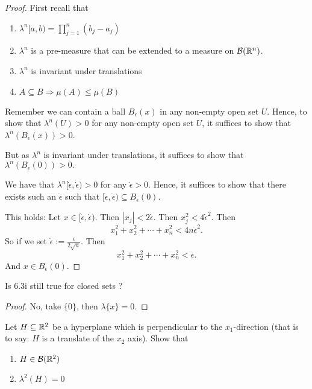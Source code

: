 \begin{proof}
First recall that

\begin{enumerate}
  \item \(\displaystyle \lambda ^n[a,b)=\prod _{j=1}^n(b_{j}-a_{j})\)
  \item \(\lambda ^n\) is a pre-measure that can be extended to a measure on \(\mathcal{B}(\Bbb{R}^n)\).
  \item \(\lambda ^n\) is invariant under translations
  \item \(A\subseteq B \Longrightarrow  \mu (A)\leq \mu (B)\)
\end{enumerate}

Remember we can contain a ball \(B_\epsilon(x)\) in any non-empty open set \(U\). Hence, to show that \(\lambda ^n(U)>0\) for any non-empty open set \(U\), it suffices to show that \(\lambda ^n(B_\epsilon(x))>0\).

But as \(\lambda ^n\) is invariant under translations, it suffices to show that \(\lambda ^n(B_\epsilon(0))>0.\)

We have that \(\lambda ^n[\dot{\epsilon},\dot{\epsilon})>0\) for any \(\dot{\epsilon}>0.\) Hence, it suffices to show that there exists such an \(\dot{\epsilon}\) such that \([\dot{\epsilon},\dot{\epsilon})\subseteq B_\epsilon(0).\)

This holds: Let \(x\in [\dot{\epsilon},\dot{\epsilon}).\) Then \(|x_{j}|<2\dot{\epsilon}.\) Then \(x_{j}^2<4\dot{\epsilon}^{2}\). Then
\[
x_{1}^2+x_{2}^2+\cdots +x_{n}^2<4n\dot{\epsilon}^2.
\]
So if we set \(\dot{\epsilon}:=\frac{\epsilon}{2\sqrt n}\). Then
\[
x_{1}^2+x_{2}^2+\cdots +x_{n}^2<\epsilon.
\]
And \(x\in B_\epsilon(0).\)

\end{proof}

\begin{thm}[Problem 6.3ii]
Is 6.3i still true for closed sets ?
\end{thm}

\begin{proof}
No, take \(\{0\}\), then \(\lambda \{x\}=0.\)
\end{proof}

\begin{thm}[Problem 6.4ii]
Let \(H\subseteq \Bbb{R}^{2}\) be a hyperplane which is perpendicular to the \(x_{1}\)-direction (that is to say: \(H\) is a translate of the \(x_{2}\) axis). Show that

\begin{enumerate}
  \item \(H\in \mathcal{B}(\Bbb{R}^2)\)
  \item \(\lambda ^2(H)=0\)
\end{enumerate}

\end{thm}


